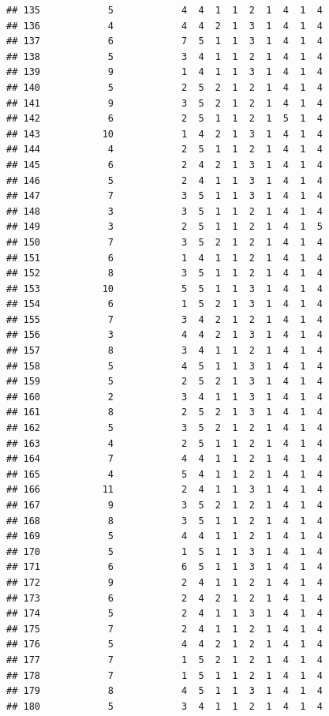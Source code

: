 \documentclass[12pt,]{krantz}
\theoremstyle{definition}
\theoremstyle{definition}
\theoremstyle{remark}
\begin{document}
\begin{verbatim}
## 135            5            4  4  1  1  2  1  4  1  4
## 136            4            4  4  2  1  3  1  4  1  4
## 137            6            7  5  1  1  3  1  4  1  4
## 138            5            3  4  1  1  2  1  4  1  4
## 139            9            1  4  1  1  3  1  4  1  4
## 140            5            2  5  2  1  2  1  4  1  4
## 141            9            3  5  2  1  2  1  4  1  4
## 142            6            2  5  1  1  2  1  5  1  4
## 143           10            1  4  2  1  3  1  4  1  4
## 144            4            2  5  1  1  2  1  4  1  4
## 145            6            2  4  2  1  3  1  4  1  4
## 146            5            2  4  1  1  3  1  4  1  4
## 147            7            3  5  1  1  3  1  4  1  4
## 148            3            3  5  1  1  2  1  4  1  4
## 149            3            2  5  1  1  2  1  4  1  5
## 150            7            3  5  2  1  2  1  4  1  4
## 151            6            1  4  1  1  2  1  4  1  4
## 152            8            3  5  1  1  2  1  4  1  4
## 153           10            5  5  1  1  3  1  4  1  4
## 154            6            1  5  2  1  3  1  4  1  4
## 155            7            3  4  2  1  2  1  4  1  4
## 156            3            4  4  2  1  3  1  4  1  4
## 157            8            3  4  1  1  2  1  4  1  4
## 158            5            4  5  1  1  3  1  4  1  4
## 159            5            2  5  2  1  3  1  4  1  4
## 160            2            3  4  1  1  3  1  4  1  4
## 161            8            2  5  2  1  3  1  4  1  4
## 162            5            3  5  2  1  2  1  4  1  4
## 163            4            2  5  1  1  2  1  4  1  4
## 164            7            4  4  1  1  2  1  4  1  4
## 165            4            5  4  1  1  2  1  4  1  4
## 166           11            2  4  1  1  3  1  4  1  4
## 167            9            3  5  2  1  2  1  4  1  4
## 168            8            3  5  1  1  2  1  4  1  4
## 169            5            4  4  1  1  2  1  4  1  4
## 170            5            1  5  1  1  3  1  4  1  4
## 171            6            6  5  1  1  3  1  4  1  4
## 172            9            2  4  1  1  2  1  4  1  4
## 173            6            2  4  2  1  2  1  4  1  4
## 174            5            2  4  1  1  3  1  4  1  4
## 175            7            2  4  1  1  2  1  4  1  4
## 176            5            4  4  2  1  2  1  4  1  4
## 177            7            1  5  2  1  2  1  4  1  4
## 178            7            1  5  1  1  2  1  4  1  4
## 179            8            4  5  1  1  3  1  4  1  4
## 180            5            3  4  1  1  2  1  4  1  4

\end{verbatim}
\end{document}
